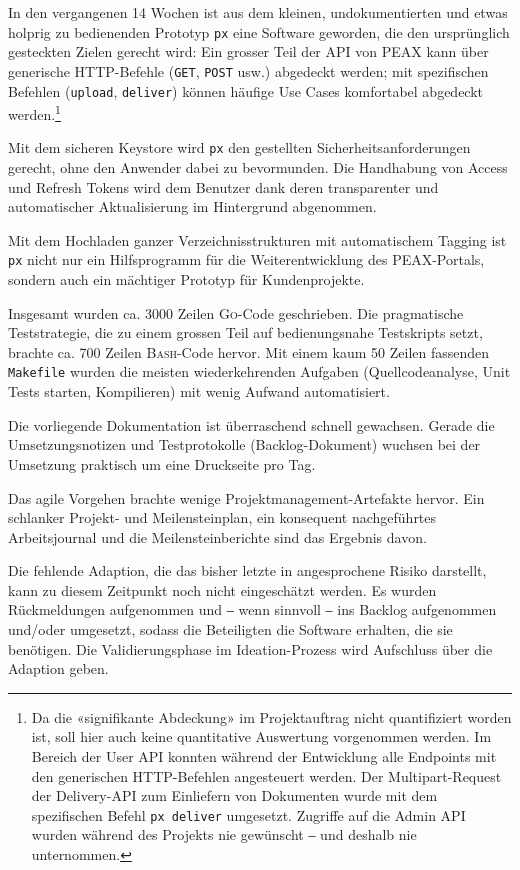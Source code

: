 In den vergangenen 14 Wochen ist aus dem kleinen, undokumentierten und etwas holprig zu bedienenden Prototyp \texttt{px} eine Software geworden, die den ursprünglich gesteckten Zielen gerecht wird: Ein grosser Teil der API von PEAX kann über generische HTTP-Befehle (\texttt{GET}, \texttt{POST} usw.) abgedeckt werden; mit spezifischen Befehlen (\texttt{upload}, \texttt{deliver}) können häufige Use Cases komfortabel abgedeckt werden.\footnote{Da die «signifikante Abdeckung» im Projektauftrag nicht quantifiziert worden ist, soll hier auch keine quantitative Auswertung vorgenommen werden. Im Bereich der User API konnten während der Entwicklung alle Endpoints mit den generischen HTTP-Befehlen angesteuert werden. Der Multipart-Request der Delivery-API zum Einliefern von Dokumenten wurde mit dem spezifischen Befehl \texttt{px deliver} umgesetzt. Zugriffe auf die Admin API wurden während des Projekts nie gewünscht ‒ und deshalb nie unternommen.}

Mit dem sicheren Keystore wird \texttt{px} den gestellten Sicherheitsanforderungen gerecht, ohne den Anwender dabei zu bevormunden. Die Handhabung von Access und Refresh Tokens wird dem Benutzer dank deren transparenter und automatischer Aktualisierung im Hintergrund abgenommen.

Mit dem Hochladen ganzer Verzeichnisstrukturen mit automatischem Tagging ist \texttt{px} nicht nur ein Hilfsprogramm für die Weiterentwicklung des PEAX-Portals, sondern auch ein mächtiger Prototyp für Kundenprojekte.

Insgesamt wurden ca. 3000 Zeilen \textsc{Go}-Code geschrieben. Die pragmatische Teststrategie, die zu einem grossen Teil auf bedienungsnahe Testskripts setzt, brachte ca. 700 Zeilen \textsc{Bash}-Code hervor. Mit einem kaum 50 Zeilen fassenden \texttt{Makefile} wurden die meisten wiederkehrenden Aufgaben (Quellcodeanalyse, Unit Tests starten, Kompilieren) mit wenig Aufwand automatisiert.

Die vorliegende Dokumentation ist überraschend schnell gewachsen. Gerade die Umsetzungsnotizen und Testprotokolle (Backlog-Dokument) wuchsen bei der Umsetzung praktisch um eine Druckseite pro Tag.

Das agile Vorgehen brachte wenige Projektmanagement-Artefakte hervor. Ein schlanker Projekt- und Meilensteinplan, ein konsequent nachgeführtes Arbeitsjournal und die Meilensteinberichte sind das Ergebnis davon.

Die fehlende Adaption, die das bisher letzte in  angesprochene Risiko darstellt, kann zu diesem Zeitpunkt noch nicht eingeschätzt werden. Es wurden Rückmeldungen aufgenommen und ‒ wenn sinnvoll ‒ ins Backlog aufgenommen und/oder umgesetzt, sodass die Beteiligten die Software erhalten, die sie benötigen. Die Validierungsphase im Ideation-Prozess wird Aufschluss über die Adaption geben.
